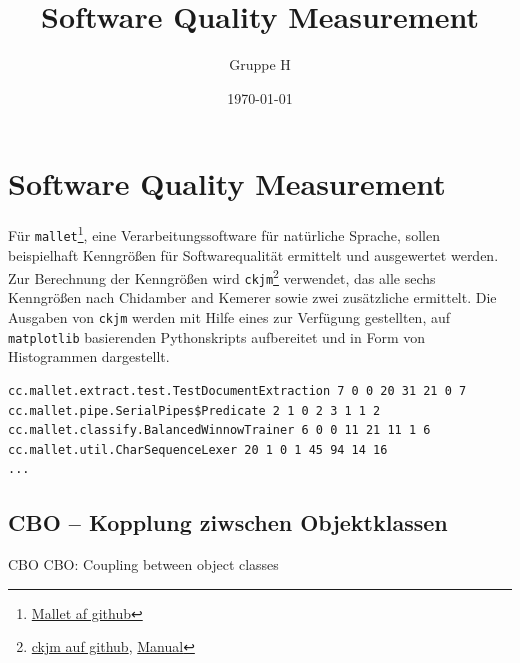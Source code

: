 \documentclass{scrreprt}
\title{Software Quality Measurement}
\author{Gruppe H}
\date{\today}
\newcommand{\lstx}[1]{\lstinline$#1$}
\begin{document}
\maketitle
\tableofcontents

\chapter{Software Quality Measurement}

Für \lstx{mallet}\footnote{\href{https://github.com/mimno/Mallet}{Mallet af github}}, eine Verarbeitungssoftware für natürliche Sprache, sollen beispielhaft Kenngrößen für Softwarequalität ermittelt und ausgewertet werden. Zur Berechnung der Kenngrößen wird \lstx{ckjm}\footnote{\href{https://github.com/dspinellis/ckjm}{ckjm auf github},  \href{https://www.spinellis.gr/sw/ckjm/doc/indexw.html}{Manual}} verwendet, das alle sechs Kenngrößen nach Chidamber and Kemerer sowie zwei zusätzliche ermittelt. Die Ausgaben von \lstx{ckjm} werden mit Hilfe eines zur Verfügung gestellten, auf \lstx{matplotlib} basierenden Pythonskripts aufbereitet und in Form von Histogrammen dargestellt.


\begin{lstlisting}[caption = Beispiele für den Output von mallet]
cc.mallet.extract.test.TestDocumentExtraction 7 0 0 20 31 21 0 7
cc.mallet.pipe.SerialPipes$Predicate 2 1 0 2 3 1 1 2
cc.mallet.classify.BalancedWinnowTrainer 6 0 0 11 21 11 1 6
cc.mallet.util.CharSequenceLexer 20 1 0 1 45 94 14 16
...
\end{lstlisting}



\section{CBO – Kopplung ziwschen Objektklassen}
CBO 
CBO: Coupling between object classes
\end{document}
